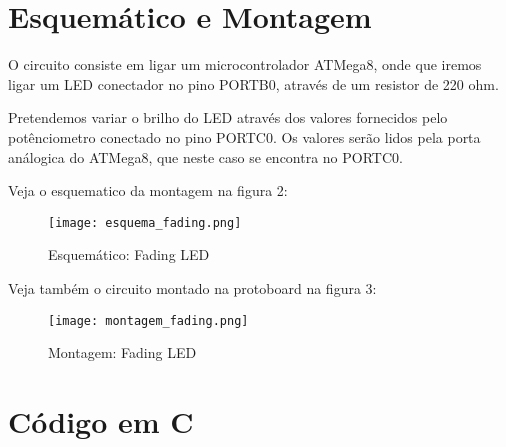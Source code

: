 \section{Esquemático e Montagem}

O circuito consiste em ligar um microcontrolador ATMega8, onde que iremos ligar um LED conectador no pino PORTB0, através de um resistor de 220 ohm.

Pretendemos variar o brilho do LED através dos valores fornecidos pelo potênciometro conectado no pino PORTC0. Os valores serão lidos pela porta análogica do ATMega8, que neste caso se encontra no PORTC0.

Veja o esquematico da montagem na figura 2:

\begin{figure}[htb]
 \caption{Esquemático: Fading LED}
 \label{fig:Fading LED}
 \centering
 \texttt{[image: esquema\_fading.png]}
 \fautor
\end{figure}

Veja também o circuito montado na protoboard na figura 3:

 \begin{figure}[htb]
 \caption{Montagem: Fading LED}
 \label{fig:Montagem Fading LED}
 \centering
 \texttt{[image: montagem\_fading.png]}
 \fautor
\end{figure}

\section{Código em C}

%

